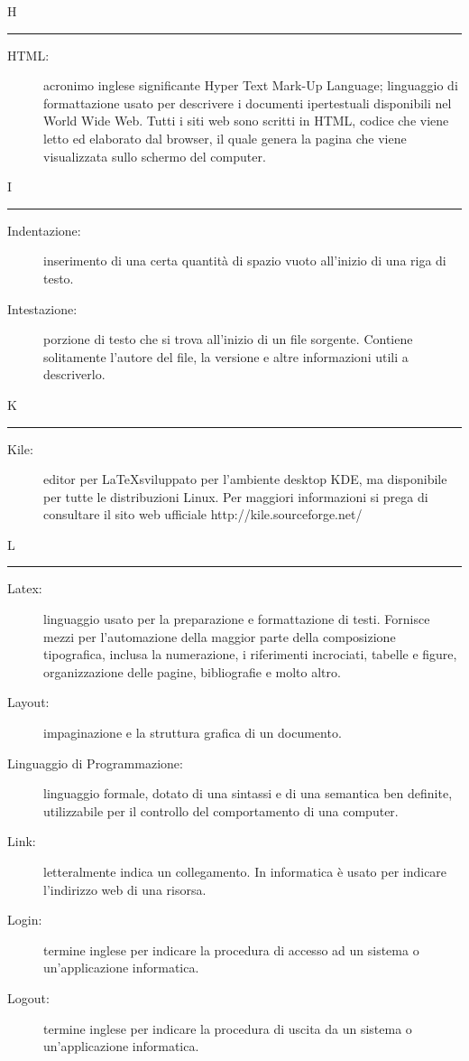 \documentclass[11pt,a4paper]{article}
\begin{document}
\bigskip
\Huge H \bigskip
\hrule
\smallskip
\normalsize
\begin{description}
	\item[HTML:] acronimo inglese significante Hyper Text Mark-Up Language; linguaggio di formattazione usato per descrivere i documenti ipertestuali disponibili nel World Wide Web. Tutti i siti web sono scritti in HTML, codice che viene letto ed elaborato dal browser, il quale genera la pagina che viene visualizzata sullo schermo del computer.
\end{description}
\bigskip
\Huge I \bigskip
\hrule
\smallskip
\normalsize
\begin{description}
	\item[Indentazione:] inserimento di una certa quantità di spazio vuoto all'inizio di una riga di testo.
	\item[Intestazione:] porzione di testo che si trova all'inizio di un file sorgente. Contiene solitamente l'autore del file, la versione e altre informazioni utili a descriverlo.
\end{description}
\bigskip
\Huge K \bigskip
\hrule
\smallskip
\normalsize
\begin{description}
	\item[Kile:] editor per \LaTeX \space sviluppato per l'ambiente desktop KDE, ma disponibile per tutte le distribuzioni Linux. Per maggiori informazioni si prega di consultare il sito web ufficiale http://kile.sourceforge.net/
\end{description}
\bigskip
\Huge L \bigskip
\hrule
\smallskip
\normalsize
\begin{description}
	\item[Latex:] linguaggio usato per la preparazione e formattazione di testi. Fornisce mezzi per l'automazione della maggior parte della composizione tipografica, inclusa la numerazione, i riferimenti incrociati, tabelle e figure, organizzazione delle pagine, bibliografie e molto altro.
	\item[Layout:] impaginazione e la struttura grafica di un documento.
	\item[Linguaggio di Programmazione:] linguaggio formale, dotato di una sintassi e di una semantica ben definite, utilizzabile per il controllo del comportamento di una computer.
	\item[Link:] letteralmente indica un collegamento. In informatica è usato per indicare l'indirizzo web di una risorsa.
	\item[Login:] termine inglese per indicare la procedura di accesso ad un sistema o un'applicazione informatica.
	\item[Logout:] termine inglese per indicare la procedura di uscita da un sistema o un'applicazione informatica.
\end{description}
\end{document}
